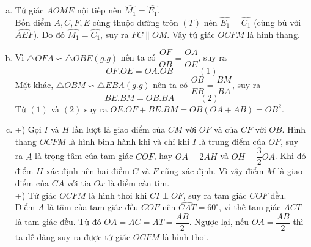 \begin{ex}
{\begin{enumerate}[a)]
\begin{center}
\end{center}
	\item Tứ giác $AOME$ nội tiếp nên $\widehat{M_1}=\widehat{E_1}$.\\
Bốn điểm $A,C,F,E$ cùng thuộc đường tròn $\left(T\right)$ nên $\widehat{E_1}=\widehat{C_1}$ (cùng bù với $\widehat{AEF}$). Do đó $\widehat{M_1}=\widehat{C_1}$, suy ra $FC\parallel OM$. Vậy tứ giác $OCFM$ là hình thang.
	\item Vì $\triangle OFA\backsim\triangle OBE (g.g)$ nên ta có $\dfrac{OF}{OB}=\dfrac{OA}{OE}$, suy ra $$OF.OE=OA.OB\qquad\quad (1)$$
Mặt khác, $\triangle OBM\backsim\triangle EBA (g.g)$ nên ta có $\dfrac{OB}{EB}=\dfrac{BM}{BA}$, suy ra $$BE.BM=OB.BA\qquad\quad (2)$$
Từ $(1)$ và $(2)$ suy ra $OE.OF+BE.BM=OB(OA+AB)=OB^2$.
    \item +) Gọi $I$ và $H$ lần lượt là giao điểm của $CM$ với $OF$ và của $CF$ với $OB$. Hình thang $OCFM$ là hình bình hành khi và chỉ khi $I$ là trung điểm của $OF$, suy ra $A$ là trọng tâm của tam giác $COF$, hay $OA=2AH$ và $OH=\dfrac{3}{2}OA$. Khi đó điểm $H$ xác định nên hai điểm $C$ và $F$ cũng xác định. Vì vậy điểm $M$ là giao điểm của $CA$ với tia $Ox$ là điểm cần tìm.\\
+) Tứ giác $OCFM$ là hình thoi khi $CI\perp OF$, suy ra tam giác $COF$ đều. Điểm $A$ là tâm của tam giác đều $COF$ nên $\widehat{CAT}=60^\circ$, vì thế tam giác $ACT$ là tam giác đều. Từ đó $OA=AC=AT=\dfrac{AB}{2}$. Ngược lại, nếu $OA=\dfrac{AB}{2}$ thì ta dễ dàng suy ra được tứ giác $OCFM$ là hình thoi.
\end{enumerate}	
}
\end{ex}

